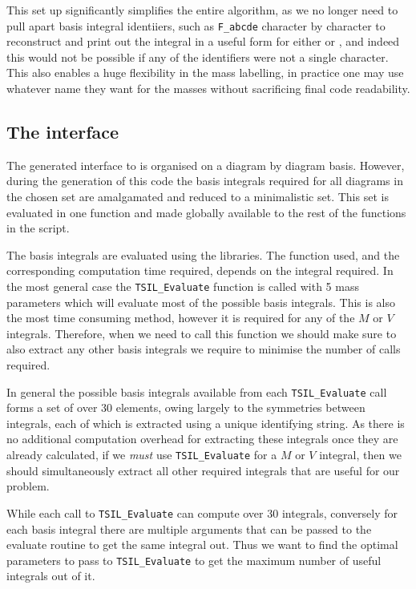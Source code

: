 This set up significantly simplifies the entire algorithm, as we no longer need to pull apart basis integral identiiers, such as \lstinline{F_abcde} character by character to reconstruct and print out the integral in a useful form for either \feyncalc or \tsils, and indeed this would not be possible if any of the identifiers were not a single character.  This also enables a huge flexibility in the mass labelling, in practice one may use whatever name they want for the masses without sacrificing final code readability.



\subsection{The \tsil interface}\label{sec:tsil_interface}

The generated \CC interface to \tsil is organised on a diagram by diagram basis.  However, during the generation of this code the basis integrals required for all diagrams in the chosen set are amalgamated and reduced to a minimalistic set.  This set is evaluated in one function and made globally available to the rest of the functions in the script.

The basis integrals are evaluated using the \tsil libraries.  The function used, and the corresponding computation time required, depends on the integral required.  In the most general case the \lstinline{TSIL_Evaluate} function is called with 5 mass parameters which will evaluate most of the possible basis integrals.  This is also the most time consuming method, however it is required for any of the $M$ or $V$ integrals.  Therefore, when we need to call this function we should make sure to also extract any other basis integrals we require to minimise the number of calls required.

In general the possible basis integrals available from each \lstinline{TSIL_Evaluate} call forms a set of over 30 elements, owing largely to the symmetries between integrals, each of which is extracted using a unique identifying string.  As there is no additional computation overhead for extracting these integrals once they are already calculated, if we \textit{must} use \lstinline{TSIL_Evaluate} for a $M$ or $V$ integral, then we should simultaneously extract all other required integrals that are useful for our problem.

While each call to \lstinline{TSIL_Evaluate} can compute over 30 integrals, conversely for each basis integral there are multiple arguments that can be passed to the evaluate routine to get the same integral out.  Thus we want to find the optimal parameters to pass to  \lstinline{TSIL_Evaluate} to get the maximum number of useful integrals out of it.

